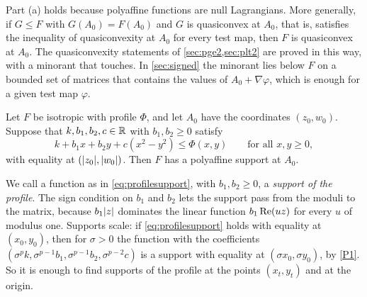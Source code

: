Part (a) holds because polyaffine functions are null Lagrangians. More generally, if $G\le F$
with $G(A_0)=F(A_0)$ and $G$ is quasiconvex at $A_0$, that is, satisfies the inequality of
quasiconvexity at $A_0$ for every test map, then $F$ is quasiconvex at $A_0$. The quasiconvexity
statements of \cref{sec:pge2,sec:plt2} are proved in this way, with a minorant that touches. In
\cref{sec:signed} the minorant lies below $F$ on a bounded set of matrices that contains the
values of $A_0+\nabla\varphi$, which is enough for a given test map $\varphi$.

\begin{lemma}\label{lem:lift}
Let $F$ be isotropic with profile $\Phi$, and let $A_0$ have the coordinates $(z_0,w_0)$.
Suppose that $k,b_1,b_2,c\in\mathbb{R}$ with $b_1,b_2\ge0$ satisfy
\begin{equation}\label{eq:profilesupport}
  k+b_1x+b_2y+c(x^2-y^2)\le\Phi(x,y)\qquad\text{for all }x,y\ge0,
\end{equation}
with equality at $(\lvert z_0\rvert,\lvert w_0\rvert)$. Then $F$ has a polyaffine support at $A_0$.
\end{lemma}

We call a function as in \eqref{eq:profilesupport}, with $b_1,b_2\ge0$, a \emph{support of the
profile}. The sign condition on $b_1$ and $b_2$ lets the support pass from the moduli to the
matrix, because $b_1\lvert z\rvert$ dominates the linear function $b_1\operatorname{Re}(uz)$ for every $u$ of modulus
one.
Supports scale: if \eqref{eq:profilesupport} holds with equality at $(x_0,y_0)$, then for
$\sigma>0$ the function with the coefficients
$(\sigma^pk,\sigma^{p-1}b_1,\sigma^{p-1}b_2,\sigma^{p-2}c)$ is a support with equality at
$(\sigma x_0,\sigma y_0)$, by \ref{P1}. So it is enough to find supports of the profile at the
points $(x_t,y_t)$ and at the origin.
